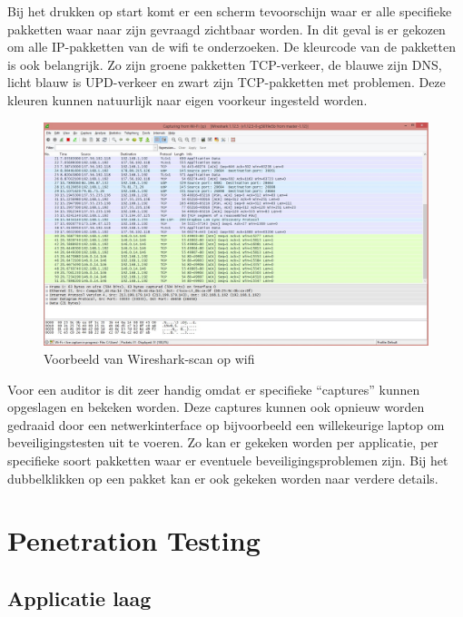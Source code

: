 \documentclass[pdftex,a4paper,12pt]{report}
\begin{document}
Bij het drukken op start komt er een scherm tevoorschijn waar er alle specifieke pakketten waar naar zijn gevraagd zichtbaar worden. In dit geval is er gekozen om alle IP-pakketten van de wifi te onderzoeken. De kleurcode van de pakketten is ook belangrijk. Zo zijn groene pakketten TCP-verkeer, de blauwe zijn DNS, licht blauw is UPD-verkeer en zwart zijn TCP-pakketten met problemen. Deze kleuren kunnen natuurlijk naar eigen voorkeur ingesteld worden. \citep{Hoffm2014}
 
\begin{figure}[H]
\begin{center}
\includegraphics[scale=0.40]{img/Wireshark2}
\end{center}
\caption{Voorbeeld van Wireshark-scan op wifi}
\end{figure}

Voor een auditor is dit zeer handig omdat er specifieke "`captures"' kunnen opgeslagen en bekeken worden. Deze captures kunnen ook opnieuw worden gedraaid door een netwerkinterface op bijvoorbeeld een willekeurige laptop om beveiligingstesten uit te voeren. Zo kan er gekeken worden per applicatie, per specifieke soort pakketten waar er eventuele beveiligingsproblemen zijn. Bij het dubbelklikken op een pakket kan er ook gekeken worden naar verdere details. 

\chapter{Penetration Testing}
\section{Applicatie laag}
\end{document}
